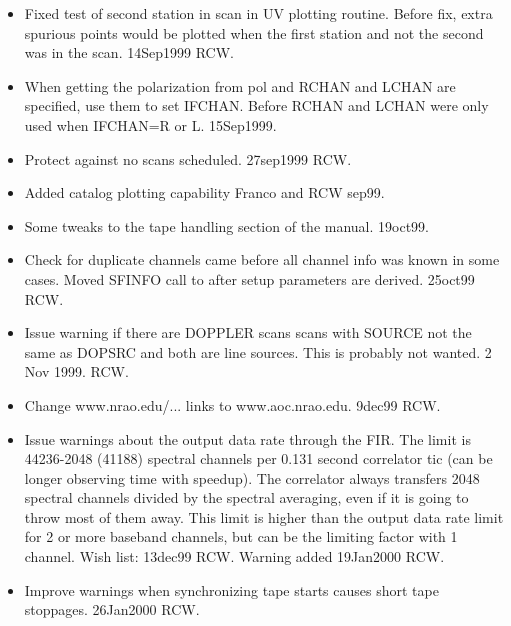 \documentclass{report}
\begin{document}
\begin{itemize}

\item  Fixed test of second station in scan in UV plotting routine.  Before
       fix, extra spurious points would be plotted when the first station
       and not the second was in the scan.  14Sep1999 RCW.

\item  When getting the polarization from pol and RCHAN and LCHAN are
       specified, use them to set IFCHAN.  Before RCHAN and LCHAN were
       only used when IFCHAN=R or L.  15Sep1999.

\item  Protect against no scans scheduled.  27sep1999 RCW.

\item  Added catalog plotting capability  Franco and RCW  sep99.

\item  Some tweaks to the tape handling section of the manual.  19oct99.

\item  Check for duplicate channels came before all channel info was
       known in some cases.  Moved SFINFO call to after setup
       parameters are derived.  25oct99 RCW.

\item  Issue warning if there are DOPPLER scans scans with SOURCE
       not the same as DOPSRC and both are line sources.  This
       is probably not wanted.  2 Nov 1999.  RCW.

\item  Change www.nrao.edu/... links to www.aoc.nrao.edu.  9dec99 RCW.

\item Issue warnings about the output data rate through the FIR.
      The limit is 44236-2048 (41188) spectral channels per 0.131 second
      correlator tic (can be longer observing time with speedup).
      The correlator always transfers 2048 spectral channels divided
      by the spectral averaging, even if it is going to throw most
      of them away.  This limit is higher than the output data rate
      limit for 2 or more baseband channels, but can be the limiting
      factor with 1 channel.   Wish list: 13dec99 RCW.
      Warning added 19Jan2000 RCW.

\item Improve warnings when synchronizing tape starts causes short
      tape stoppages.  26Jan2000 RCW.


\end{itemize}
\end{document}
